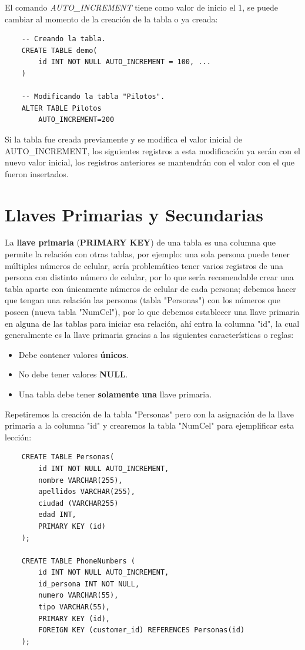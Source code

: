 El comando \textit{AUTO\_INCREMENT} tiene como valor de inicio el 1, se puede cambiar al momento de la creación de la tabla o ya creada:
\begin{lstlisting}
    -- Creando la tabla.
    CREATE TABLE demo(
        id INT NOT NULL AUTO_INCREMENT = 100, ...
    )

    -- Modificando la tabla "Pilotos".
    ALTER TABLE Pilotos
        AUTO_INCREMENT=200
\end{lstlisting}

Si la tabla fue creada previamente y se modifica el valor inicial de AUTO\_INCREMENT, los siguientes registros a esta modificación ya serán con el nuevo valor inicial, los registros anteriores se mantendrán con el valor con el que fueron insertados.



\section{Llaves Primarias y Secundarias}

La \textbf{llave primaria} (\textbf{PRIMARY KEY}) de una tabla es una columna que permite la relación con otras tablas, por ejemplo: una sola persona puede tener múltiples números de celular, sería problemático tener varios registros de una persona con distinto número de celular, por lo que sería recomendable crear una tabla aparte con únicamente números de celular de cada persona; debemos hacer que tengan una relación las personas (tabla "Personas") con los números que poseen (nueva tabla "NumCel"), por lo que debemos establecer una llave primaria en alguna de las tablas para iniciar esa relación, ahí entra la columna "id", la cual generalmente es la llave primaria gracias a las siguientes características o reglas:
\begin{itemize}
    \item Debe contener valores \textbf{únicos}.
    \item No debe tener valores \textbf{NULL}.
    \item Una tabla debe tener \textbf{solamente una} llave primaria.
\end{itemize}

Repetiremos la creación de la tabla "Personas" pero con la asignación de la llave primaria a la columna "id" y crearemos la tabla "NumCel" para ejemplificar esta lección:
\begin{lstlisting}
    CREATE TABLE Personas(
        id INT NOT NULL AUTO_INCREMENT,
        nombre VARCHAR(255),
        apellidos VARCHAR(255),
        ciudad (VARCHAR255)
        edad INT,
        PRIMARY KEY (id)
    );

    CREATE TABLE PhoneNumbers (
        id INT NOT NULL AUTO_INCREMENT,
        id_persona INT NOT NULL,
        numero VARCHAR(55),
        tipo VARCHAR(55),
        PRIMARY KEY (id),
        FOREIGN KEY (customer_id) REFERENCES Personas(id)
    );
\end{lstlisting}

